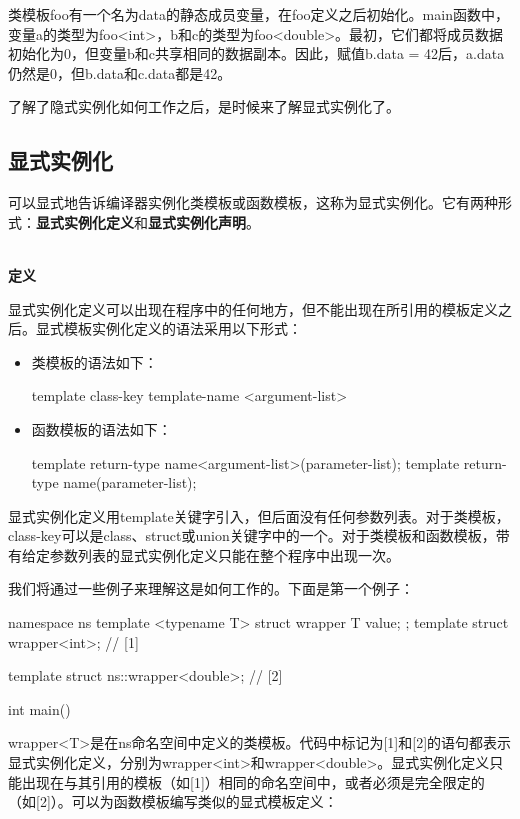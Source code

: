 类模板foo有一个名为data的静态成员变量，在foo定义之后初始化。main函数中，变量a的类型为foo<int>，b和c的类型为foo<double>。最初，它们都将成员数据初始化为0，但变量b和c共享相同的数据副本。因此，赋值b.data = 42后，a.data仍然是0，但b.data和c.data都是42。

了解了隐式实例化如何工作之后，是时候来了解显式实例化了。

\subsection{显式实例化}

可以显式地告诉编译器实例化类模板或函数模板，这称为显式实例化。它有两种形式：\textbf{显式实例化定义}和\textbf{显式实例化声明}。


\hspace*{\fill} \\ %
\noindent\textbf{定义}

显式实例化定义可以出现在程序中的任何地方，但不能出现在所引用的模板定义之后。显式模板实例化定义的语法采用以下形式：

\begin{itemize}
  \item 类模板的语法如下：
\begin{cppcode}
template class-key template-name <argument-list>
\end{cppcode}
  \item 函数模板的语法如下：
\begin{cppcode}
template return-type name<argument-list>(parameter-list);
template return-type name(parameter-list);
\end{cppcode}
\end{itemize}

显式实例化定义用template关键字引入，但后面没有任何参数列表。对于类模板，class-key可以是class、struct或union关键字中的一个。对于类模板和函数模板，带有给定参数列表的显式实例化定义只能在整个程序中出现一次。

我们将通过一些例子来理解这是如何工作的。下面是第一个例子：

\begin{cppcode}
namespace ns
{
	template <typename T>
	struct wrapper
	{
		T value;
	};
	template struct wrapper<int>; // [1]
}

template struct ns::wrapper<double>; // [2]

int main() {}
\end{cppcode}

wrapper<T>是在ns命名空间中定义的类模板。代码中标记为[1]和[2]的语句都表示显式实例化定义，分别为wrapper<int>和wrapper<double>。显式实例化定义只能出现在与其引用的模板（如[1]）相同的命名空间中，或者必须是完全限定的（如[2]）。可以为函数模板编写类似的显式模板定义：

